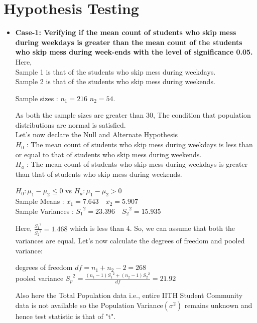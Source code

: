 \documentclass{article}
\begin{document}
\section{Hypothesis Testing}
\begin{itemize}
\item{\textbf{Case-1: Verifying if the mean count of students who skip mess during weekdays is greater than the mean count of the students who skip mess during week-ends with the level of significance 0.05.}}\\
Here, \\
Sample 1 is that of the students who skip mess during weekdays.\\
Sample 2 is that of the students who skip mess during weekends.
\begin{center}
Sample sizes : $n_1 = 216$ \quad $n_2 = 54$.
\end{center}
As both the sample sizes are greater than 30, The condition that population distributions are normal is satisfied.\\
Let's now declare the Null and Alternate Hypothesis\\
\textbf{$H_0$} : The mean count of students who skip mess during weekdays is less than or equal to that of students who skip mess during weekends.\\
\textbf{$H_a$} : The mean count of students who skip mess during weekdays is greater than that of students who skip mess during weekends.
\begin{center}
$H_0:\mu_1 - \mu_2 \leq 0$  vs  $H_a:\mu_1 - \mu_2 > 0$\\
Sample Means : $\bar{x_1} = 7.643  \quad \bar{x_2} = 5.907 $\\
Sample Variances : ${S_1}^2 = 23.396 \quad {S_2}^2 = 15.935$\\
\end{center}
Here, $\frac{{S_1}^2}{{S_2}^2} = 1.468$ which is less than 4. So, we can assume that both the variances are equal.
Let's now calculate the degrees of freedom and pooled variance:
\begin{center}
degrees of freedom $df = n_1 + n_2 - 2 = 268$\\
pooled variance ${S_p}^2 = \frac{\left(n_1-1\right){S_1}^2 + \left(n_2-1\right){S_2}^2}{df} = 21.92$
\end{center}
Also here the Total Population data i.e., entire IITH Student Community data is not available so the Population Variance$(\sigma^2)$ remains unknown and hence test statistic is that of "t".\\

\end{itemize}
\end{document}
